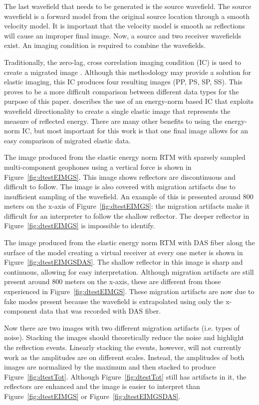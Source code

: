 The last wavefield that needs to be generated is the source wavefield. The source wavefield is a forward model from the original source location through a smooth velocity model. It is important that the velocity model is smooth as reflections will cause an improper final image. Now, a source and two receiver wavefields exist. An imaging condition is required to combine the wavefields.

Traditionally, the zero-lag, cross correlation imaging condition (IC) is used to create a migrated image \citep{claerbout1985imaging}. Although this methodology may provide a solution for elastic imaging, this IC produces four resulting images (PP, PS, SP, SS). This proves to be a more difficult comparison between different data types for the purpose of this paper. \citet{rocha2016isotropic} describes the use of an energy-norm based IC that exploits wavefield directionality to create a single elastic image that represents the measure of reflected energy. There are many other benefits to using the energy-norm IC, but most important for this work is that one final image allows for an easy comparison of migrated elastic data.

The image produced from the elastic energy norm RTM with sparsely sampled multi-component geophones using a vertical force is shown in Figure~\ref{fig:dtestEIMGS}. This image shows reflectors are discontinuous and difficult to follow. The image is also covered with migration artifacts due to insufficient sampling of the wavefield. An example of this is presented around 800 meters on the x-axis of Figure~\ref{fig:dtestEIMGS}: the migration artifacts make it difficult for an interpreter to follow the shallow reflector. The deeper reflector in Figure~\ref{fig:dtestEIMGS} is impossible to identify.

The image produced from the elastic energy norm RTM with DAS fiber along the surface of the model creating a virtual receiver at every one meter is shown in Figure~\ref{fig:dtestEIMGSDAS}. The shallow reflector in this image is sharp and continuous, allowing for easy interpretation. Although migration artifacts are still present around 800 meters on the x-axis, these are different from those experienced in Figure~\ref{fig:dtestEIMGS}. These migration artifacts are now due to fake modes present because the wavefield is extrapolated using only the x-component data that was recorded with DAS fiber.

Now there are two images with two different migration artifacts (i.e. types of noise). Stacking the images should theoretically reduce the noise and highlight the reflection events. Linearly stacking the events, however, will not currently work as the amplitudes are on different scales. Instead, the amplitudes of both images are normalized by the maximum and then stacked to produce Figure~\ref{fig:dtestTot}. Although Figure~\ref{fig:dtestTot} still has artifacts in it, the reflectors are enhanced and the image is easier to interpret than Figure~\ref{fig:dtestEIMGS} or Figure~\ref{fig:dtestEIMGSDAS}.

